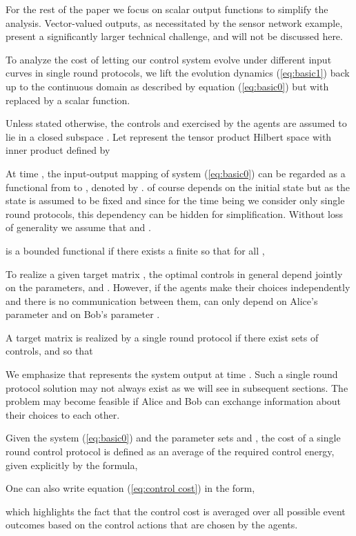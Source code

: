 \documentclass[12pt,onecolumn,draftcls]{IEEEtran}
\begin{document}
For the rest of the paper we focus on scalar output functions to simplify the analysis.
Vector-valued outputs, as necessitated by the sensor network example, present a significantly
larger technical challenge, and will not be discussed here.

To analyze the cost of letting our control system evolve under different input curves in single round protocols,
we lift the evolution dynamics (\ref{eq:basic1}) back up to the continuous domain as described by equation (\ref{eq:basic0}) but with  replaced
by a scalar function.

Unless stated otherwise, the controls  and  exercised by the agents are assumed to lie in a closed subspace .
Let  represent the tensor product Hilbert space with inner product defined by

At time , the input-output mapping of system (\ref{eq:basic0}) can be regarded as a functional from 
 to , denoted by .  of course depends
on the initial state  but as the state is assumed to be fixed and since for the time being we consider
only single round protocols, this dependency can be hidden for simplification.
Without loss of generality we assume that  and .  

 is a bounded functional if there exists a finite  so that for all ,


To realize a given target matrix , the optimal controls in general depend jointly on the 
parameters,  and .  However, if the agents make their choices independently and there is no communication
between them,  can only depend on Alice's parameter  and  on Bob's parameter .

A target matrix  is realized by a single round protocol  if there exist sets of 
controls,  and  so that

We emphasize that  represents the system output at time .
Such a single round protocol solution may not always exist as we will see in subsequent sections.
The problem may become feasible if Alice and Bob can exchange information about their choices to each other.

Given the system (\ref{eq:basic0}) and the parameter sets  and , the cost of a single round control protocol  is
defined as an average of the required control energy, given explicitly by the formula,

One can also write equation (\ref{eq:control cost}) in the form,

which highlights the fact that the control cost is averaged over all possible event outcomes based on the control actions that are chosen by the agents.
\end{document}
